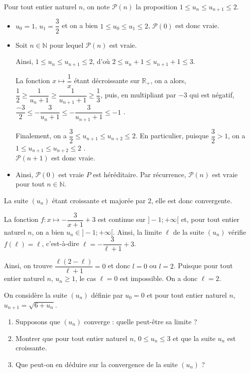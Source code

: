 \documentclass[11pt,fleqn, openany]{book} %
\begin{document}
\begin{solution}Pour tout entier naturel $n$, on note $\mathcal{P}(n)$ la proposition  $1\leqslant u_n\leqslant u_{n+1}\leqslant 2$.
\begin{itemize}
\item $u_0=1$, $u_1=\dfrac{3}{2}$ et on a bien $1\leqslant u_0 \leqslant u_1 \leqslant 2$, $\mathcal{P}(0)$ est donc vraie.
\item Soit $n \in \mathbb{N}$ pour lequel $\mathcal{P}(n)$ est vraie. 

Ainsi, $1 \leqslant u_n \leqslant u_{n+1} \leqslant 2$, d'où $2 \leqslant u_n +1 \leqslant u_{n+1}+1 \leqslant 3$. 

La fonction $x\mapsto \dfrac{1}{x}$ étant décroissante sur $\mathbb{R}_+$, on a alors, $\dfrac{1}{2} \geqslant \dfrac{1}{u_n+1} \geqslant \dfrac{1}{u_{n+1}+1} \geqslant \dfrac{1}{3}$, puis, en multipliant par $-3$ qui est négatif, $\dfrac{-3}{2} \leqslant -\dfrac{3}{u_n+1} \leqslant -\dfrac{3}{u_{n+1}+1} \leqslant -1$ .

Finalement, on a $\dfrac{3}{2} \leqslant u_{n+1} \leqslant u_{n+2} \leqslant 2$. En particulier, puisque $\dfrac{3}{2} >1$, on a $1\leqslant u_{n+1} \leqslant u_{n+2} \leqslant 2$
. \\ $\mathcal{P}(n+1)$ est donc vraie.
\item Ainsi, $\mathcal{P}(0)$ est vraie $P$ est héréditaire. Par récurrence, $\mathcal{P}(n)$ est vraie pour tout $n\in\mathbb{N}$.
\end{itemize}

La suite $(u_n)$ étant croissante et majorée par 2, elle est donc convergente.

La fonction $f:x \mapsto -\dfrac{3}{x+1}+3$ est continue sur $]-1;+\infty [$ et, pour tout entier naturel $n$, on a bien $u_n \in ]-1 ; +\infty [$. Ainsi, la limite $\ell$ de la suite $(u_n)$ vérifie $f(\ell)=\ell$, c'est-à-dire $\ell = -\dfrac{3}{\ell + 1}+3$.

Ainsi, on trouve $\dfrac{\ell(2-\ell)}{\ell+1}=0$ et donc $l=0$ ou $l=2$. Puisque pour tout entier naturel $n$, $u_n \geqslant 1$, le cas $\ell=0$ est impossible. On a donc $\ell=2$.\end{solution}



\begin{exercise}[topic=cont02]
On considère la suite $(u_n)$ définie par $u_0=0$ et pour tout entier naturel $n$, $u_{n+1}=\sqrt{6+u_n}$.
\begin{enumerate}
\item Supposons que $(u_n)$ converge : quelle peut-être sa limite ?
\item Montrer que pour tout entier naturel $n$, $0\leqslant u_n \leqslant 3$ et que la suite $u_n$ est croissante.
\item Que peut-on en déduire sur la convergence de la suite $(u_n)$ ?
\end{enumerate}
\end{exercise}
\end{document}
